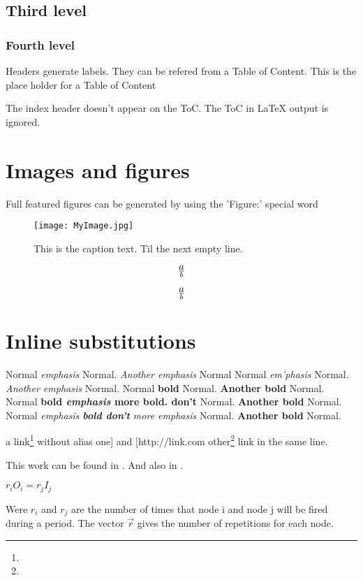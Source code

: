 \subsection{Third level}

\subsubsection{Fourth level}

Headers generate labels.
They can be refered from a Table of Content.
This is the place holder for a Table of Content



The index header doesn't appear on the ToC.
The ToC in LaTeX output is ignored.

\section{Images and figures}
\label{OtherLabel}

Full featured figures can be generated by using the 'Figure:' special word
\begin{figure*}[htbp]
\begin{center}\texttt{[image: MyImage.jpg]}\end{center}
\caption{%
This is the caption text.
Til the next empty line.
}
\label{MyLabel}
\end{figure*}


\[
a\over{b}
\]

\begin{equation}
a\over{b}
\end{equation}


\section{Inline substitutions}

Normal {\em emphasis} Normal. {\em Another emphasis} Normal
Normal {\em em'phasis} Normal. {\em Another emphasis} Normal.
Normal {\bf bold} Normal. {\bf Another bold} Normal.
Normal {\bf bold {\em emphasis} more bold. don't } Normal. {\bf Another bold} Normal.
Normal {\em emphasis {\bf bold don't} more emphasis} Normal. {\bf Another bold} Normal.

a link\footnote{}
 without alias
one] and [http://link.com other\footnote{} link in the same line.

This work can be found in \cite{lee87}. And also in \cite{www-CLAM}.


$r_iO_i=r_jI_j$

Were $r_i$ and $r_j$ are the number of times that node i and node j will be fired during a period. The vector $\vec{r}$ gives the number of repetitions for each node.


